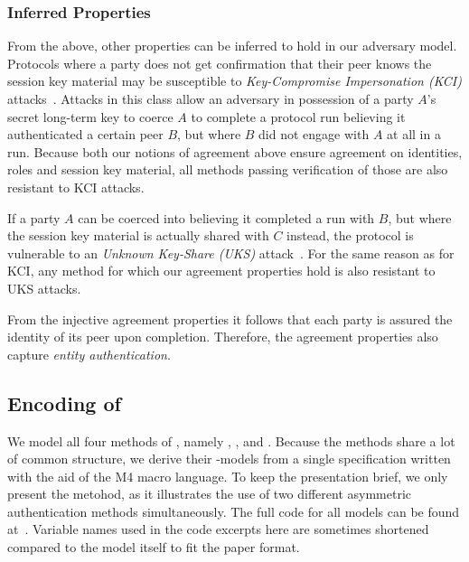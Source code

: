 \subsubsection{Inferred Properties}
From the above, other properties can be inferred to hold in our adversary model.
%
Protocols where a party does not get confirmation that their peer knows the
session key material may be susceptible to
\emph{Key-Compromise Impersonation (KCI)}
attacks~\cite{DBLP:conf/ima/Blake-WilsonJM97}.
%
Attacks in this class allow an adversary in possession of a party $A$'s secret
long-term key to coerce $A$ to complete a
protocol run believing it authenticated a certain peer $B$, but where $B$ did
not engage with $A$ at all in a run.
%
Because both our notions of agreement above ensure agreement on identities,
roles and session key material, all methods passing verification of those are
also resistant to KCI attacks.
%

If a party $A$ can be coerced into believing it completed a run with $B$, but
where the session key material is actually shared with $C$ instead, the 
protocol is vulnerable to an \emph{Unknown Key-Share (UKS)}
attack~\cite{DBLP:conf/ima/Blake-WilsonJM97}.
%
For the same reason as for KCI, any method for which our agreement
properties hold is also resistant to UKS attacks.
%

From the injective agreement properties it follows that each party is assured
the identity of its peer upon completion.
%
Therefore, the agreement properties also capture \emph{entity authentication}.
%

\subsection{\mTamarin{} Encoding of \mEdhoc{}}
\label{sec:modeling}
%
We model all four methods of \mEdhoc{}, namely
\mSigSig, \mSigStat, \mStatSig{} and \mStatStat.
%
Because the methods share a lot of common structure, we derive
their \mTamarin-models from a single specification written with the aid of the
M4 macro language.
%
To keep the presentation brief, we only present the \mStatSig{} metohod, as it
illustrates the use of two different asymmetric authentication methods
simultaneously.
%
The full \mTamarin{} code for all models can be found at~\cite{edhocTamarinRepo}.
%
Variable names used in the code excerpts here are sometimes shortened compared
to the model itself to fit the paper format.
%

